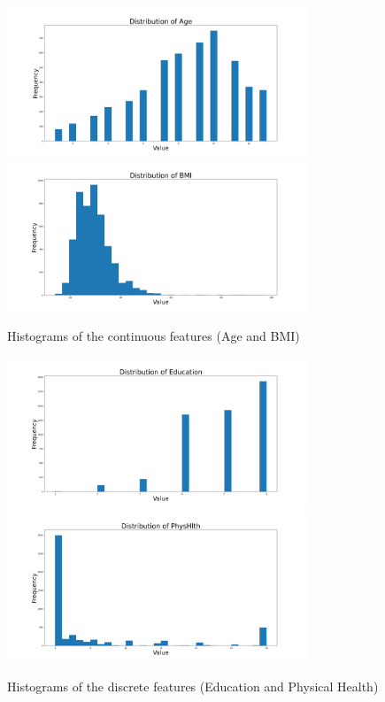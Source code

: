 \documentclass{article}
\begin{document}
\begin{figure}[h]
    \centering
    \includegraphics[width=0.8\textwidth]{./figures/hist-Age.png}
    \includegraphics[width=0.8\textwidth]{./figures/hist-BMI.png}
    \caption{Histograms of the continuous features (Age and BMI)}
    \label{fig:histograms}
\end{figure}

\begin{figure}[h]
    \centering
    \includegraphics[width=0.8\textwidth]{./figures/hist-Education.png}
    \includegraphics[width=0.8\textwidth]{./figures/hist-PhysHlth.png}
    \caption{Histograms of the discrete features (Education and Physical Health)}
    \label{fig:histograms-discrete}
\end{figure}
\end{document}
